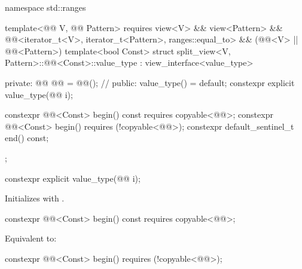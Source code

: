 %
\begin{codeblock}
namespace std::ranges {
  template<@@ V, @@ Pattern>
    requires view<V> && view<Pattern> &&
             @@<iterator_t<V>, iterator_t<Pattern>, ranges::equal_to> &&
             (@@<V> || @@<Pattern>)
  template<bool Const>
  struct split_view<V, Pattern>::@@<Const>::value_type
    : view_interface<value_type> {
  private:
    @@ @@ = @@();               // \expos
  public:
    value_type() = default;
    constexpr explicit value_type(@@ i);

    constexpr @@<Const> begin() const requires copyable<@@>;
    constexpr @@<Const> begin() requires (!copyable<@@>);
    constexpr default_sentinel_t end() const;
  };
}
\end{codeblock}

%
\begin{itemdecl}
constexpr explicit value_type(@@ i);
\end{itemdecl}

\begin{itemdescr}
\pnum
\effects
Initializes  with .
\end{itemdescr}

%
\begin{itemdecl}
constexpr @@<Const> begin() const requires copyable<@@>;
\end{itemdecl}

\begin{itemdescr}
\pnum
\effects
Equivalent to: 
\end{itemdescr}

%
\begin{itemdecl}
constexpr @@<Const> begin() requires (!copyable<@@>);
\end{itemdecl}


